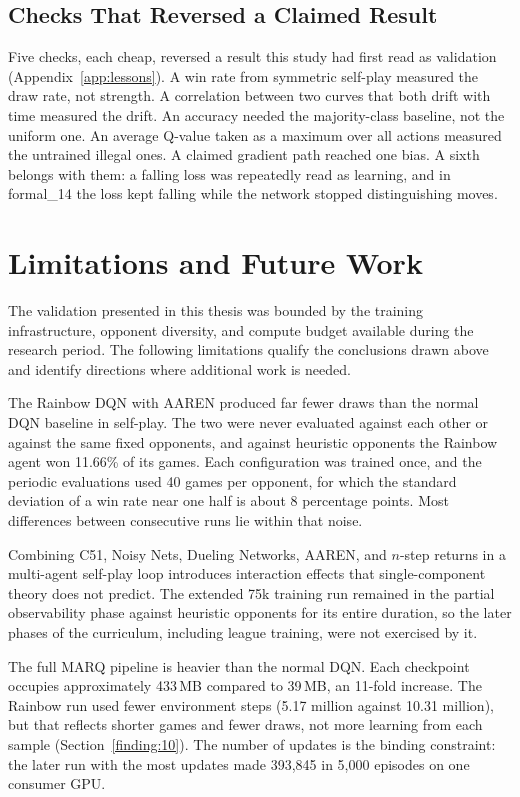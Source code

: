 \subsection{Checks That Reversed a Claimed Result}

Five checks, each cheap, reversed a result this study had first read as validation (Appendix~\ref{app:lessons}). A win rate from symmetric self-play measured the draw rate, not strength. A correlation between two curves that both drift with time measured the drift. An accuracy needed the majority-class baseline, not the uniform one. An average Q-value taken as a maximum over all actions measured the untrained illegal ones. A claimed gradient path reached one bias. A sixth belongs with them: a falling loss was repeatedly read as learning, and in formal\_14 the loss kept falling while the network stopped distinguishing moves.

\section{Limitations and Future Work}

The validation presented in this thesis was bounded by the training infrastructure, opponent diversity, and compute budget available during the research period. The following limitations qualify the conclusions drawn above and identify directions where additional work is needed.

The Rainbow DQN with AAREN produced far fewer draws than the normal DQN baseline in self-play. The two were never evaluated against each other or against the same fixed opponents, and against heuristic opponents the Rainbow agent won 11.66\% of its games. Each configuration was trained once, and the periodic evaluations used 40 games per opponent, for which the standard deviation of a win rate near one half is about 8 percentage points. Most differences between consecutive runs lie within that noise.

Combining C51, Noisy Nets, Dueling Networks, AAREN, and $n$-step returns in a multi-agent self-play loop introduces interaction effects that single-component theory does not predict. The extended 75k training run remained in the partial observability phase against heuristic opponents for its entire duration, so the later phases of the curriculum, including league training, were not exercised by it.

The full MARQ pipeline is heavier than the normal DQN. Each checkpoint occupies approximately 433\,MB compared to 39\,MB, an 11-fold increase. The Rainbow run used fewer environment steps (5.17 million against 10.31 million), but that reflects shorter games and fewer draws, not more learning from each sample (Section~\ref{finding:10}). The number of updates is the binding constraint: the later run with the most updates made 393,845 in 5,000 episodes on one consumer GPU.

